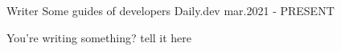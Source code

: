 

\begin{cventries}

  \cventry
    {Writer} %
    {Some guides of developers} %
    {Daily.dev} %
    {mar.2021  - PRESENT} %
    {
      \begin{cvitems} %
        \item {You're writing something? tell it here}
      \end{cvitems}
    }

\end{cventries}
